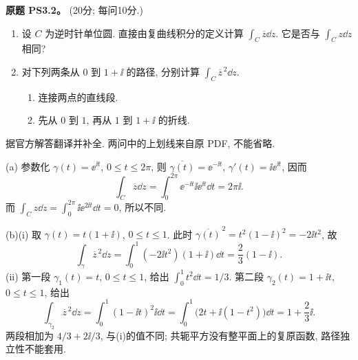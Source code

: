 \begin{exercise}\label{ass:ps3-2}
\textbf{原题 PS3.2。} (20分; 每问10分.)
\begin{enumerate}[label=(\alph*)]
\item 设 $C$ 为逆时针单位圆. 直接由复曲线积分的定义计算
$\int_C\overline z\dd z$. 它是否与 $\int_Cz\dd z$ 相同?
\item 对下列两条从 $0$ 到 $1+\ii$ 的路径, 分别计算 $\int_C\overline z^{\,2}\dd z$.
\begin{enumerate}[label=(\roman*)]
\item 连接两点的直线段.
\item 先从 $0$ 到 $1$, 再从 $1$ 到 $1+\ii$ 的折线.
\end{enumerate}
\end{enumerate}
\end{exercise}
\begin{solution}
据官方解答翻译并补全. 两问中的上划线来自原 PDF, 不能省略.

(a) 参数化 $\gamma(t)=\ee^{\ii t}$, $0\le t\le2\pi$, 则
$\overline{\gamma(t)}=\ee^{-\ii t}$, $\gamma'(t)=\ii\ee^{\ii t}$, 因而
\[
 \int_C\overline z\dd z
 =\int_0^{2\pi}\ee^{-\ii t}\ii\ee^{\ii t}\dd t=2\pi\ii.
\]
而 $\int_Cz\dd z=\int_0^{2\pi}\ii\ee^{2\ii t}\dd t=0$, 所以不同.

(b)(i) 取 $\gamma(t)=t(1+\ii)$, $0\le t\le1$. 此时
$\overline{\gamma(t)}^{\,2}=t^2(1-\ii)^2=-2\ii t^2$, 故
\[
 \int_\gamma\overline z^{\,2}\dd z
 =\int_0^1(-2\ii t^2)(1+\ii)\dd t=\frac23(1-\ii).
\]
(ii) 第一段 $\gamma_1(t)=t$, $0\le t\le1$, 给出 $\int_0^1t^2\dd t=1/3$.
第二段 $\gamma_2(t)=1+\ii t$, $0\le t\le1$, 给出
\[
 \int_{\gamma_2}\overline z^{\,2}\dd z
 =\int_0^1(1-\ii t)^2\ii\dd t
 =\int_0^1\bigl(2t+\ii(1-t^2)\bigr)\dd t
 =1+\frac23\ii.
\]
两段相加为 $4/3+2\ii/3$, 与(i)的值不同; 共轭平方没有整平面上的复原函数, 路径独立性不能套用.
\begin{center}
\end{center}
\end{solution}

